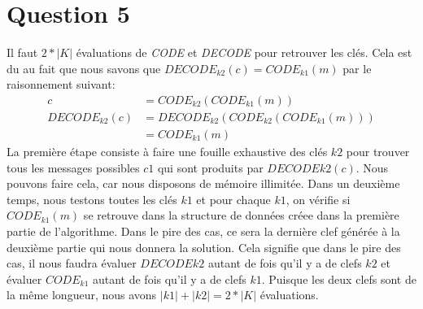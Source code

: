 \documentclass[letterpaper,12pt]{scrartcl}
\begin{document}
	\section*{Question 5}
		Il faut $2*|K|$ évaluations de \textit{CODE} et \textit{DECODE} pour retrouver les clés. Cela est du au fait que nous savons que $DECODE_{k2}(c) = CODE_{k1}(m)$ par le raisonnement suivant: 
		\begin{align*}
		c & = CODE_{k2}(CODE_{k1}(m)) \\
		DECODE_{k2}(c) & = DECODE_{k2}(CODE_{k2}(CODE_{k1}(m))) \\
					   & = CODE_{k1}(m)
		\end{align*}
La première étape consiste à faire une fouille exhaustive des clés $k2$ pour trouver tous les messages possibles $c1$ qui sont produits par $DECODE{k2}(c)$. Nous pouvons faire cela, car nous disposons de mémoire illimitée. Dans un deuxième temps, nous testons toutes les clés $k1$ et pour chaque $k1$, on vérifie si $CODE_{k1}(m)$ se retrouve dans la structure de données créee dans la première partie de l'algorithme. Dans le pire des cas, ce sera la dernière clef générée à la deuxième partie qui nous donnera la solution. Cela signifie que dans le pire des cas, il nous faudra évaluer $DECODE{k2}$ autant de fois qu'il y a de clefs $k2$ et évaluer $CODE_{k1}$ autant de fois qu'il y a de clefs $k1$. Puisque les deux clefs sont de la même longueur, nous avons $|k1| + |k2| = 2*|K|$ évaluations. 
\end{document}
